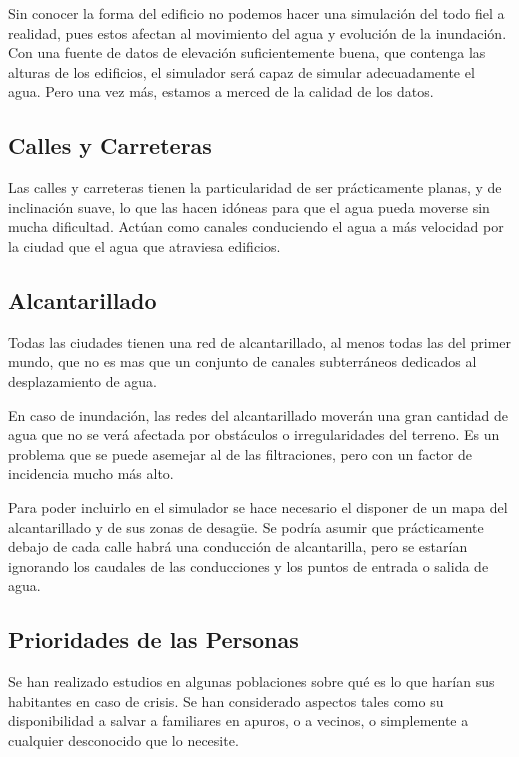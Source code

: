Sin conocer la forma del edificio no podemos hacer una simulación del todo fiel
a realidad, pues estos afectan al movimiento del agua y evolución de la
inundación. Con una fuente de datos de elevación suficientemente buena, que
contenga las alturas de los edificios, el simulador será capaz de simular
adecuadamente el agua. Pero una vez más, estamos a merced de la calidad de los
datos.

\subsection{Calles y Carreteras}

Las calles y carreteras tienen la particularidad de ser prácticamente planas, y
de inclinación suave, lo que las hacen idóneas para que el agua pueda moverse
sin mucha dificultad. Actúan como canales conduciendo el agua a más velocidad
por la ciudad que el agua que atraviesa edificios.

\subsection{Alcantarillado}

Todas las ciudades tienen una red de alcantarillado, al menos todas las del
primer mundo, que no es mas que un conjunto de canales subterráneos dedicados
al desplazamiento de agua.

En caso de inundación, las redes del alcantarillado moverán una gran cantidad de
agua que no se verá afectada por obstáculos o irregularidades del terreno. Es un
problema que se puede asemejar al de las filtraciones, pero con un factor de
incidencia mucho más alto.

Para poder incluirlo en el simulador se hace necesario el disponer de un mapa
del alcantarillado y de sus zonas de desagüe. Se podría asumir que prácticamente
debajo de cada calle habrá una conducción de alcantarilla, pero se estarían
ignorando los caudales de las conducciones y los puntos de entrada o salida de
agua.

\subsection{Prioridades de las Personas}

Se han realizado estudios\cite{Liu07} en algunas poblaciones sobre qué es
lo que harían sus habitantes en caso de crisis. Se han considerado aspectos
tales como su disponibilidad a salvar a familiares en apuros, o a vecinos, o
simplemente a cualquier desconocido que lo necesite.

